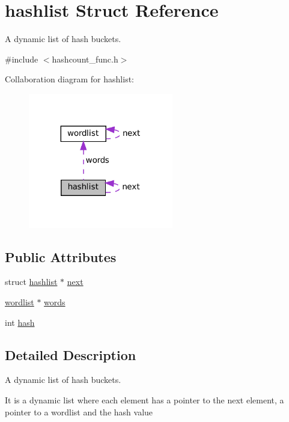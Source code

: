 \hypertarget{structhashlist}{}\section{hashlist Struct Reference}
\label{structhashlist}


A dynamic list of hash buckets.  




{\ttfamily \#include $<$hashcount\+\_\+func.\+h$>$}



Collaboration diagram for hashlist\+:\nopagebreak
\begin{figure}[H]
\begin{center}
\leavevmode
\includegraphics[width=179pt]{structhashlist__coll__graph}
\end{center}
\end{figure}
\subsection*{Public Attributes}
\begin{DoxyCompactItemize}
\item 
struct \hyperlink{structhashlist}{hashlist} $\ast$ \hyperlink{structhashlist_ac31c298110f5630adfb6e051cf8657ac}{next}
\item 
\hyperlink{structwordlist}{wordlist} $\ast$ \hyperlink{structhashlist_a62f143e3e8911dccb242579a7f06e973}{words}
\item 
int \hyperlink{structhashlist_aab67bf6a16fd9f0ae1ad7190acc95298}{hash}
\end{DoxyCompactItemize}


\subsection{Detailed Description}
A dynamic list of hash buckets. 

It is a dynamic list where each element has a pointer to the next element, a pointer to a wordlist and the hash value 

